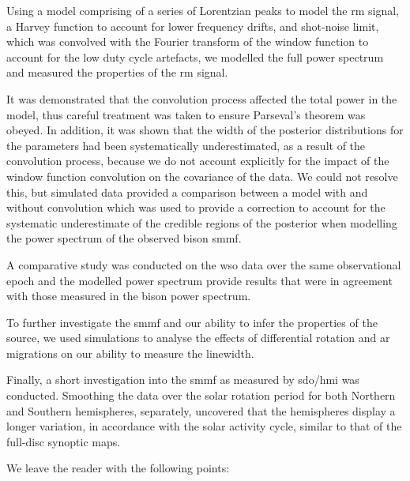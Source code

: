 Using a model comprising of a series of Lorentzian peaks to model the \gls{rm} signal, a Harvey function to account for lower frequency drifts, and shot-noise limit, which was convolved with the Fourier transform of the window function to account for the low duty cycle artefacts, we modelled the full power spectrum and measured the properties of the \gls{rm} signal.

It was demonstrated that the convolution process affected the total power in the model, thus careful treatment was taken to ensure Parseval's theorem was obeyed. In addition, it was shown that the width of the posterior distributions for the parameters had been systematically underestimated, as a result of the convolution process, because we do not account explicitly for the impact of the window function convolution on the covariance of the data. We could not resolve this, but simulated data provided a comparison between a model with and without convolution which was used to provide a correction to account for the systematic underestimate of the credible regions of the posterior when modelling the power spectrum of the observed \gls{bison} \gls{smmf}.

A comparative study was conducted on the \gls{wso} data over the same observational epoch and the modelled power spectrum provide results that were in agreement with those measured in the \gls{bison} power spectrum.

To further investigate the \gls{smmf} and our ability to infer the properties of the source, we used simulations to analyse the effects of differential rotation and \gls{ar} migrations on our ability to measure the linewidth.

Finally, a short investigation into the \gls{smmf} as measured by \gls{sdo/hmi} was conducted. Smoothing the data over the solar rotation period for both Northern and Southern hemispheres, separately, uncovered that the hemispheres display a longer variation, in accordance with the solar activity cycle, similar to that of the full-disc synoptic maps.

We leave the reader with the following points:

